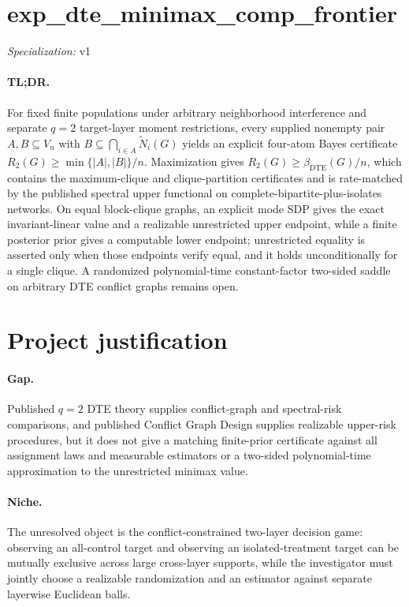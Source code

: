 \documentclass{article}
\begin{document}
\sloppy

\section*{exp\_\allowbreak{}dte\_\allowbreak{}minimax\_\allowbreak{}comp\_\allowbreak{}frontier}

\noindent\textit{Specialization:} v1\par

\paragraph{TL;DR.} For fixed finite populations under arbitrary neighborhood interference and separate \(q=2\) target-layer moment restrictions, every supplied nonempty pair \(A,B\subseteq V_n\) with \(B\subseteq\bigcap_{i\in A}\widetilde N_i(G)\) yields an explicit four-atom Bayes certificate \(R_2(G)\geq\min\{|A|,|B|\}/n\). Maximization gives \(R_2(G)\geq\beta_{\mathrm{DTE}}(G)/n\), which contains the maximum-clique and clique-partition certificates and is rate-matched by the published spectral upper functional on complete-bipartite-plus-isolates networks. On equal block-clique graphs, an explicit mode SDP gives the exact invariant-linear value and a realizable unrestricted upper endpoint, while a finite posterior prior gives a computable lower endpoint; unrestricted equality is asserted only when those endpoints verify equal, and it holds unconditionally for a single clique. A randomized polynomial-time constant-factor two-sided saddle on arbitrary DTE conflict graphs remains open.

\section{Project justification}

\paragraph{Gap.} Published \(q=2\) DTE theory supplies conflict-graph and spectral-risk comparisons, and published Conflict Graph Design supplies realizable upper-risk procedures, but it does not give a matching finite-prior certificate against all assignment laws and measurable estimators or a two-sided polynomial-time approximation to the unrestricted minimax value.

\paragraph{Niche.} The unresolved object is the conflict-constrained two-layer decision game: observing an all-control target and observing an isolated-treatment target can be mutually exclusive across large cross-layer supports, while the investigator must jointly choose a realizable randomization and an estimator against separate layerwise Euclidean balls.
\end{document}
